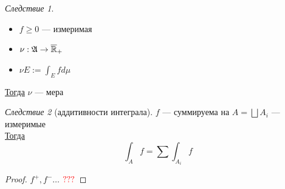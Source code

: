 \documentclass[russ,oneside]{book}
\newcommand{\R}{\mathbb{R}}
\theoremstyle{plain}
\theoremstyle{remark}
\newtheorem{corollary}{Следствие}[theorem]
\theoremstyle{definition}
\begin{document}
\begin{corollary}
\begin{itemize}
\item \(f \ge 0\) --- измеримая
\item \(\nu: \A \to \overline{\R}_+\)
\item \(\nu E := \int_E fd\mu\)
\end{itemize}
\uline{Тогда} \(\nu\) --- мера
\end{corollary}
\begin{corollary}[аддитивности интеграла]
\(f\) --- суммируема на \(A = \bigsqcup A_i\) --- измеримые \\
\uline{Тогда} \[ \int_A f = \sum \int_{A_i} f \]
\end{corollary}
\begin{proof}
\(f^+, f^- \dots\) \(\color{red}???\)
\end{proof}
\end{document}
